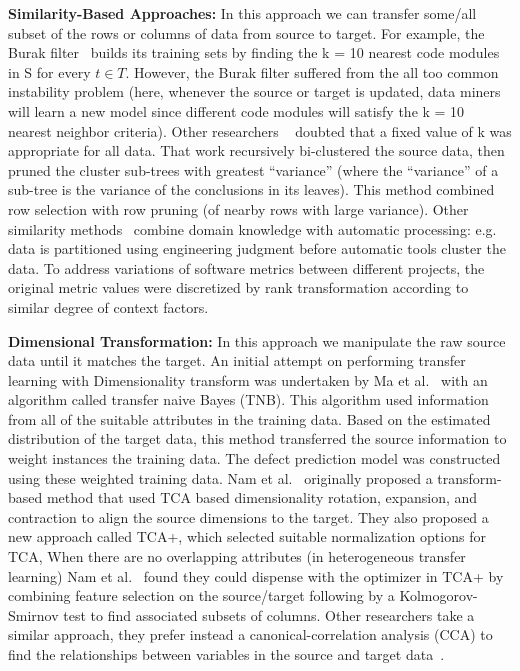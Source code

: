 \documentclass[10pt,journal,compsoc]{IEEEtran}
\begin{document}
 \textbf{Similarity-Based Approaches:} In this approach we can transfer some/all subset of the rows or columns of data from source to target. For example, the Burak filter~\cite{turhan09} builds its training sets by finding the k = 10 nearest code modules in S for every $ t \in T $. However, the Burak filter suffered from the all too common instability problem (here, whenever the source or target is updated, data miners will learn a new model since different code modules will satisfy the k = 10 nearest neighbor criteria). Other researchers ~\cite{kocaguneli2012, kocaguneli2011find} doubted that a fixed value of k was appropriate for all data. That work recursively bi-clustered the source data, then pruned the cluster sub-trees with greatest ``variance'' (where the ``variance'' of a sub-tree is the variance of the conclusions in its leaves). This method combined row selection with row pruning (of nearby rows with large variance). Other similarity methods~\cite{Zhang16aa} combine domain knowledge with automatic processing: e.g. data is partitioned using engineering judgment before automatic tools cluster the data. To address variations of software metrics between different projects, the original metric values were discretized by rank transformation according to similar degree of context factors.
    
\textbf{Dimensional Transformation:} In this approach we manipulate the raw source data until it matches the target. An initial attempt on performing transfer learning with Dimensionality transform was undertaken by Ma et al.~\cite{Ma2012} with an algorithm called transfer naive Bayes (TNB). This algorithm used information from all of the suitable attributes in the training data. Based on the estimated distribution of the target data, this method transferred the source information to weight instances the training data. The defect prediction model was constructed using these weighted training data. Nam et al.~\cite{Nam13} originally proposed a transform-based method that used TCA based dimensionality rotation, expansion, and contraction to align the source dimensions to the target. They also proposed a new approach called TCA+, which selected suitable normalization options for TCA, When there are no overlapping attributes (in heterogeneous transfer learning) Nam et al.~\cite{Nam2015} found they could dispense with the optimizer in TCA+ by combining feature selection on the source/target following by a Kolmogorov-Smirnov test to find associated subsets of columns. Other researchers take a similar approach, they prefer instead a canonical-correlation analysis (CCA) to find the relationships between variables in the source and target data~\cite{jing2015heterogeneous}.
\end{document}
